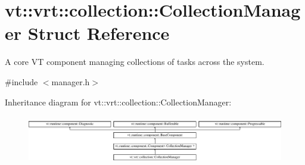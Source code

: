 \hypertarget{structvt_1_1vrt_1_1collection_1_1_collection_manager}{}\section{vt\+:\+:vrt\+:\+:collection\+:\+:Collection\+Manager Struct Reference}
\label{structvt_1_1vrt_1_1collection_1_1_collection_manager}


A core VT component managing collections of tasks across the system.  




{\ttfamily \#include $<$manager.\+h$>$}

Inheritance diagram for vt\+:\+:vrt\+:\+:collection\+:\+:Collection\+Manager\+:\begin{figure}[H]
\begin{center}
\leavevmode
\includegraphics[height=2.170543cm]{structvt_1_1vrt_1_1collection_1_1_collection_manager}
\end{center}
\end{figure}
